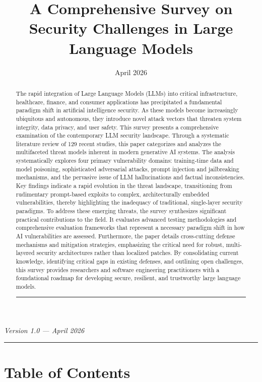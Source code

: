 \documentclass[11pt,a4paper]{article}
\title{A Comprehensive Survey on Security Challenges in Large Language Models}
\author{}
\date{April 2026}
\begin{document}
\maketitle

\begin{abstract}
The rapid integration of Large Language Models (LLMs) into critical infrastructure, healthcare, finance, and consumer applications has precipitated a fundamental paradigm shift in artificial intelligence security. As these models become increasingly ubiquitous and autonomous, they introduce novel attack vectors that threaten system integrity, data privacy, and user safety. This survey presents a comprehensive examination of the contemporary LLM security landscape. Through a systematic literature review of 129 recent studies, this paper categorizes and analyzes the multifaceted threat models inherent in modern generative AI systems. The analysis systematically explores four primary vulnerability domains: training-time data and model poisoning, sophisticated adversarial attacks, prompt injection and jailbreaking mechanisms, and the pervasive issue of LLM hallucinations and factual inconsistencies. Key findings indicate a rapid evolution in the threat landscape, transitioning from rudimentary prompt-based exploits to complex, architecturally embedded vulnerabilities, thereby highlighting the inadequacy of traditional, single-layer security paradigms. To address these emerging threats, the survey synthesizes significant practical contributions to the field. It evaluates advanced testing methodologies and comprehensive evaluation frameworks that represent a necessary paradigm shift in how AI vulnerabilities are assessed. Furthermore, the paper details cross-cutting defense mechanisms and mitigation strategies, emphasizing the critical need for robust, multi-layered security architectures rather than localized patches. By consolidating current knowledge, identifying critical gaps in existing defenses, and outlining open challenges, this survey provides researchers and software engineering practitioners with a foundational roadmap for developing secure, resilient, and trustworthy large language models.

\noindent\rule{\textwidth}{0.4pt}
\end{abstract}


\textit{Version 1.0 --- April 2026}

\noindent\rule{\textwidth}{0.4pt}
\section{Table of Contents}
\end{document}

